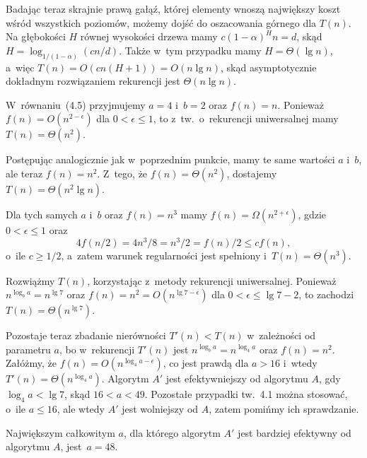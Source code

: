 Badając teraz skrajnie prawą gałąź, której elementy wnoszą największy koszt wśród wszystkich poziomów, możemy dojść do oszacowania górnego dla $T(n)$. Na głębokości $H$ równej wysokości drzewa mamy $c(1-\alpha)^Hn=d$, skąd $H=\log_{1/(1-\alpha)}(cn/d)$. Także w~tym przypadku mamy $H=\Theta(\lg n)$, a~więc $T(n)=O(cn(H+1))=O(n\lg n)$, skąd asymptotycznie dokładnym rozwiązaniem rekurencji jest $\Theta(n\lg n)$.



\exercise %

\subexercise
W~równaniu~(4.5) przyjmujemy $a=4$ i~$b=2$ oraz $f(n)=n$. Ponieważ $f(n)=O(n^{2-\epsilon})$ dla $0<\epsilon\le1$, to z~tw.~o~rekurencji uniwersalnej mamy $T(n)=\Theta(n^2)$.

\subexercise
Postępując analogicznie jak w~poprzednim punkcie, mamy te same wartości $a$ i~$b$, ale teraz $f(n)=n^2$. Z~tego, że $f(n)=\Theta(n^2)$, dostajemy $T(n)=\Theta(n^2\lg n)$.

\subexercise
Dla tych samych $a$ i~$b$ oraz $f(n)=n^3$ mamy $f(n)=\Omega(n^{2+\epsilon})$, gdzie $0<\epsilon\le1$ oraz
\[
	4f(n/2) = 4n^3\!/8 = n^3\!/2 = f(n)/2 \le cf(n),
\]
o~ile $c\ge1/2$, a~zatem warunek regularności jest spełniony i~$T(n)=\Theta(n^3)$.

\exercise %
Rozwiążmy $T(n)$, korzystając z~metody rekurencji uniwersalnej. Ponieważ $n^{\log_ba}=n^{\lg7}$ oraz $f(n)=n^2=O(n^{\lg7-\epsilon})$ dla $0<\epsilon\le\lg7-2$, to zachodzi $T(n)=\Theta(n^{\lg7})$.

Pozostaje teraz zbadanie nierówności $T'(n)<T(n)$ w~zależności od parametru $a$, bo w~rekurencji $T'(n)$ jest $n^{\log_ba}=n^{\log_4a}$ oraz $f(n)=n^2$. Załóżmy, że $f(n)=O(n^{\log_4a-\epsilon})$, co jest prawdą dla $a>16$ i~wtedy $T'(n)=\Theta(n^{\log_4a})$. Algorytm $A'$ jest efektywniejszy od algorytmu $A$, gdy $\log_4a<\lg7$, skąd $16<a<49$. Pozostałe przypadki tw.~4.1 można stosować, o~ile $a\le16$, ale wtedy $A'$ jest wolniejszy od $A$, zatem pomińmy ich sprawdzanie.

Największym całkowitym $a$, dla którego algorytm $A'$ jest bardziej efektywny od algorytmu $A$, jest~$a=48$.

